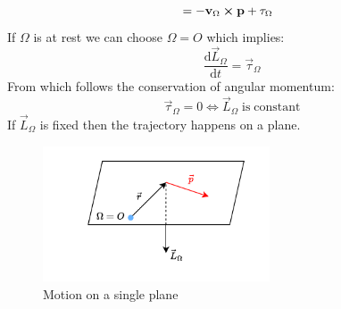 \begin{itemize}
\begin{equation}
\begin{split}
        &= - \vb{v}_{\Omega}\cross\vb{p} + \vb{\tau}_{\Omega}
      \end{split}
    \end{equation}
    If $\Omega$ is at rest we can choose $\Omega = O$ which implies:
    \begin{equation}
        \dfrac{\mathrm{d}\vec{L}_{\Omega}}{\mathrm{d}t} = \vec{\tau}_{\Omega}
    \end{equation}
    From which follows the conservation of angular momentum:
    \begin{equation}
        \vec{\tau}_{\Omega} = 0 \iff\vec{L}_{\Omega}\;\mathrm{is\;constant}
    \end{equation}
    If $\vec{L}_{\Omega}$ is fixed then the trajectory happens on a plane.
    \begin{figure}[H]
        \centering
        \includegraphics[width=0.6\textwidth]{res/svg/singleplanemotion.drawio}
        \caption{Motion on a single plane}
        \label{fig:image3}
    \end{figure}
\end{itemize}
